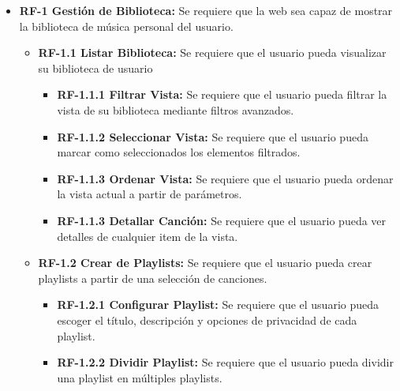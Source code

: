 \begin{itemize}
\tightlist

    \item
        \textbf{RF-1 Gestión de Biblioteca:} Se requiere que la web sea capaz de mostrar la biblioteca de música personal del usuario.
        \begin{itemize}
           \tightlist
           
            \item
                \textbf{RF-1.1 Listar Biblioteca:} Se requiere que el usuario pueda visualizar su biblioteca de usuario
                \begin{itemize}
                    \item
                        \textbf{RF-1.1.1 Filtrar Vista:} Se requiere que el usuario pueda filtrar la vista de su biblioteca mediante filtros avanzados.
                    \item
                        \textbf{RF-1.1.2 Seleccionar Vista:} Se requiere que el usuario pueda marcar como seleccionados los elementos filtrados.
                    \item
                        \textbf{RF-1.1.3 Ordenar Vista:} Se requiere que el usuario pueda ordenar la vista actual a partir de parámetros.
                    \item
                        \textbf{RF-1.1.3 Detallar Canción:} Se requiere que el usuario pueda ver detalles de cualquier item de la vista. 
                \end{itemize}
                
            \item
                \textbf{RF-1.2 Crear de Playlists:} Se requiere que el usuario pueda crear playlists a partir de una selección de canciones.   
                \begin{itemize}
                    \item 
                        \textbf{RF-1.2.1 Configurar Playlist:} Se requiere que el usuario pueda escoger el título, descripción y opciones de privacidad de cada playlist.
                    \item 
                        \textbf{RF-1.2.2 Dividir Playlist:} Se requiere que el usuario pueda dividir una playlist en múltiples playlists.
                \end{itemize}
                

\end{itemize}
\end{itemize}

